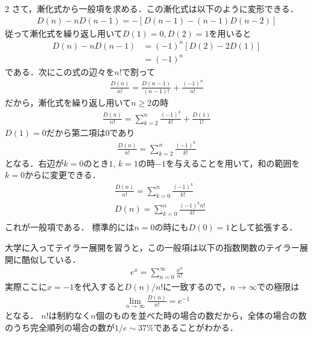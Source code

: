 \documentclass[../../main.tex]{subfiles}
\begin{document}
\begin{multicols}{2}
  さて，漸化式から一般項を求める．この漸化式は以下のように変形できる．
  \begin{align*}
    D(n) - nD(n-1) = -\left[D(n-1)-(n-1)D(n-2)\right]
  \end{align*}
  従って漸化式を繰り返し用いて$D(1)=0, D(2)=1$を用いると
  \begin{align*}
    D(n) - nD(n-1)
     & = (-1)^{n}\left[D(2)-2D(1)\right] \\
     & = (-1)^{n}
  \end{align*}
  である．次にこの式の辺々を$n!$で割って
  \begin{align*}
    \frac{D(n)}{n!} = \frac{D(n-1)}{(n-1)!} + \frac{(-1)^n}{n!}
  \end{align*}
  だから，漸化式を繰り返し用いて$n \ge 2$の時
  \begin{align*}
    \frac{D(n)}{n!} = \sum_{k=2}^{n}\frac{(-1)^{k}}{k!} + \frac{D(1)}{1!}
  \end{align*}
  $D(1)=0$だから第二項は$0$であり
  \begin{align*}
    \frac{D(n)}{n!} = \sum_{k=2}^{n}\frac{(-1)^{k}}{k!}
  \end{align*}
  となる．右辺が$k=0$のとき$1$, $k=1$の時$-1$を与えることを用いて，和の範囲を$k=0$からに変更できる．
  \begin{align*}
     & \frac{D(n)}{n!} = \sum_{k=0}^{n}\frac{(-1)^{k}}{k!} \\
     & D(n)= \sum_{k=0}^{n}\frac{(-1)^{k}n!}{k!}           \\
  \end{align*}
  これが一般項である．
  標準的には$n=0$の時にも$D(0)=1$として拡張する．

  大学に入ってテイラー展開を習うと，この一般項は以下の指数関数のテイラー展開に酷似している．
  \begin{align*}
    e^{x} = \sum_{n=0}^{\infty}\frac{x^n}{n!}
  \end{align*}
  実際ここに$x=-1$を代入すると$D(n)/n!$に一致するので，$n\to\infty$での極限は
  \begin{align*}
    \lim_{n\to\infty}\frac{D(n)}{n!} = e^{-1}
  \end{align*}
  となる．
  $n!$は制約なく$n$個のものを並べた時の場合の数だから，全体の場合の数のうち完全順列の場合の数が$1/e\sim 37\%$であることがわかる．


  \newpage
\end{multicols}
\end{document}
